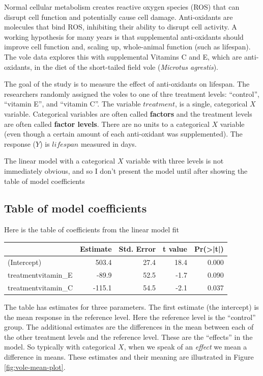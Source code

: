 \documentclass[]{book}
\begin{document}
Normal cellular metabolism creates reactive oxygen species (ROS) that
can disrupt cell function and potentially cause cell damage.
Anti-oxidants are molecules that bind ROS, inhibiting their ability to
disrupt cell activity. A working hypothesis for many years is that
supplemental anti-oxidants should improve cell function and, scaling up,
whole-animal function (such as lifespan). The vole data explores this
with supplemental Vitamins C and E, which are anti-oxidants, in the diet
of the short-tailed field vole (\emph{Microtus agrestis}).

The goal of the study is to measure the effect of anti-oxidants on
lifespan. The researchers randomly assigned the voles to one of thre
treatment levels: ``control'', ``vitamin E'', and ``vitamin C''. The
variable \(treatment\), is a single, categorical \(X\) variable.
Categorical variables are often called \textbf{factors} and the
treatment levels are often called \textbf{factor levels}. There are no
units to a categorical \(X\) variable (even though a certain amount of
each anti-oxidant was supplemented). The response (\(Y\)) is
\(lifespan\) measured in days.

The linear model with a categorical \(X\) variable with three levels is
not immediately obvious, and so I don't present the model until after
showing the table of model coefficients

\subsection{Table of model
coefficients}\label{table-of-model-coefficients}

Here is the table of coefficients from the linear model fit

\begin{tabular}{l|r|r|r|r}
\hline
  & Estimate & Std. Error & t value & Pr(>|t|)\\
\hline
(Intercept) & 503.4 & 27.4 & 18.4 & 0.000\\
\hline
treatmentvitamin\_E & -89.9 & 52.5 & -1.7 & 0.090\\
\hline
treatmentvitamin\_C & -115.1 & 54.5 & -2.1 & 0.037\\
\hline
\end{tabular}

The table has estimates for three parameters. The first estimate (the
intercept) is the mean response in the reference level. Here the
reference level is the ``control'' group. The additional estimates are
the differences in the mean between each of the other treatment levels
and the reference level. These are the ``effects'' in the model. So
typically with categorical \(X\), when we speak of an \emph{effect} we
mean a difference in means. These estimates and their meaning are
illustrated in Figure \ref{fig:vole-mean-plot}.
\end{document}
